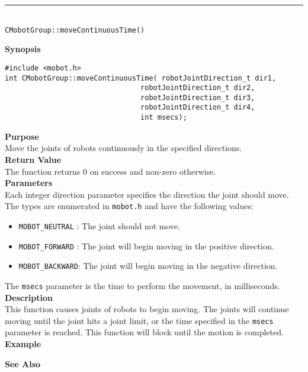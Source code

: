 \noindent
\vspace{5pt}
\rule{4.5in}{0.015in}\\
\noindent
{\LARGE \texttt{CMobotGroup::moveContinuousTime()}}\\
{}

\noindent
{\bf Synopsis}\\
\begin{verbatim}
#include <mobot.h>
int CMobotGroup::moveContinuousTime( robotJointDirection_t dir1, 
                                robotJointDirection_t dir2, 
                                robotJointDirection_t dir3, 
                                robotJointDirection_t dir4, 
                                int msecs);
\end{verbatim}

\noindent
{\bf Purpose}\\
Move the joints of robots continuously in the specified directions.\\

\noindent
{\bf Return Value}\\
The function returns 0 on success and non-zero otherwise.\\

\noindent
{\bf Parameters}\\
Each integer direction parameter specifies the direction the joint should move. The types
are enumerated in \texttt{mobot.h} and have the following values:
\begin{itemize}
\item \texttt{MOBOT\_NEUTRAL} : The joint should not move.
\item \texttt{MOBOT\_FORWARD} : The joint will begin moving in the positive direction.
\item \texttt{MOBOT\_BACKWARD}: The joint will begin moving in the negative direction.
\end{itemize}
The \texttt{msecs} parameter is the time to perform the movement, in milliseconds.
\\

\noindent
{\bf Description}\\
This function causes joints of robots to begin moving. The joints will continue moving
until the joint hits a joint limit, or the time specified in the \texttt{msecs} parameter
is reached. This function will block until the motion is completed.\\

\noindent
{\bf Example}\\
\noindent

\noindent
{\bf See Also}\\

